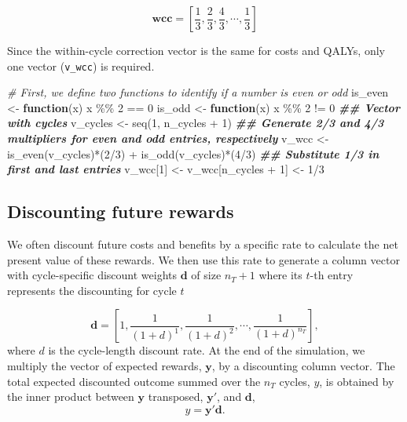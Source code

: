 \documentclass[
]{article}
\newenvironment{Shaded}{\begin{snugshade}}{\end{snugshade}}
\newcommand{\CommentTok}[1]{\textcolor[rgb]{0.56,0.35,0.01}{\textit{#1}}}
\newcommand{\ControlFlowTok}[1]{\textcolor[rgb]{0.13,0.29,0.53}{\textbf{#1}}}
\newcommand{\DecValTok}[1]{\textcolor[rgb]{0.00,0.00,0.81}{#1}}
\newcommand{\DocumentationTok}[1]{\textcolor[rgb]{0.56,0.35,0.01}{\textbf{\textit{#1}}}}
\newcommand{\FunctionTok}[1]{\textcolor[rgb]{0.00,0.00,0.00}{#1}}
\newcommand{\NormalTok}[1]{#1}
\newcommand{\OtherTok}[1]{\textcolor[rgb]{0.56,0.35,0.01}{#1}}
\newcommand{\SpecialCharTok}[1]{\textcolor[rgb]{0.00,0.00,0.00}{#1}}
\begin{document}
\[
  \mathbf{wcc} = \left[\frac{1}{3}, \frac{2}{3}, \frac{4}{3}, \cdots, \frac{1}{3}\right]
\]

Since the within-cycle correction vector is the same for costs and QALYs, only one vector (\texttt{v\_wcc}) is required.

\begin{Shaded}
\begin{Highlighting}[]
\CommentTok{\# First, we define two functions to identify if a number is even or odd}
\NormalTok{is\_even }\OtherTok{\textless{}{-}} \ControlFlowTok{function}\NormalTok{(x) x }\SpecialCharTok{\%\%} \DecValTok{2} \SpecialCharTok{==} \DecValTok{0}
\NormalTok{is\_odd  }\OtherTok{\textless{}{-}} \ControlFlowTok{function}\NormalTok{(x) x }\SpecialCharTok{\%\%} \DecValTok{2} \SpecialCharTok{!=} \DecValTok{0}
\DocumentationTok{\#\# Vector with cycles}
\NormalTok{v\_cycles }\OtherTok{\textless{}{-}} \FunctionTok{seq}\NormalTok{(}\DecValTok{1}\NormalTok{, n\_cycles }\SpecialCharTok{+} \DecValTok{1}\NormalTok{)}
\DocumentationTok{\#\# Generate 2/3 and 4/3 multipliers for even and odd entries, respectively}
\NormalTok{v\_wcc }\OtherTok{\textless{}{-}} \FunctionTok{is\_even}\NormalTok{(v\_cycles)}\SpecialCharTok{*}\NormalTok{(}\DecValTok{2}\SpecialCharTok{/}\DecValTok{3}\NormalTok{) }\SpecialCharTok{+} \FunctionTok{is\_odd}\NormalTok{(v\_cycles)}\SpecialCharTok{*}\NormalTok{(}\DecValTok{4}\SpecialCharTok{/}\DecValTok{3}\NormalTok{)}
\DocumentationTok{\#\# Substitute 1/3 in first and last entries}
\NormalTok{v\_wcc[}\DecValTok{1}\NormalTok{] }\OtherTok{\textless{}{-}}\NormalTok{ v\_wcc[n\_cycles }\SpecialCharTok{+} \DecValTok{1}\NormalTok{] }\OtherTok{\textless{}{-}} \DecValTok{1}\SpecialCharTok{/}\DecValTok{3}
\end{Highlighting}
\end{Shaded}

\hypertarget{discounting-future-rewards}{%
\subsection{Discounting future rewards}\label{discounting-future-rewards}}

We often discount future costs and benefits by a specific rate to calculate the net present value of these rewards. We then use this rate to generate a column vector with cycle-specific discount weights \(\mathbf{d}\) of size \(n_T+1\) where its \(t\)-th entry represents the discounting for cycle \(t\)

\[
  \mathbf{d} = \left[1, \frac{1}{(1+d)^{1}}, \frac{1}{(1+d)^{2}}, \cdots, \frac{1}{(1+d)^{n_T}}\right],
\]
where \(d\) is the cycle-length discount rate. At the end of the simulation, we multiply the vector of expected rewards, \(\mathbf{y}\), by a discounting column vector. The total expected discounted outcome summed over the \(n_T\) cycles, \(y\), is obtained by the inner product between \(\mathbf{y}\) transposed, \(\mathbf{y'}\), and \(\mathbf{d}\),
\begin{equation}
 y = \mathbf{y'} \mathbf{d}.
 \label{eq:tot-exp-disc-rewd}
\end{equation}
\end{document}
